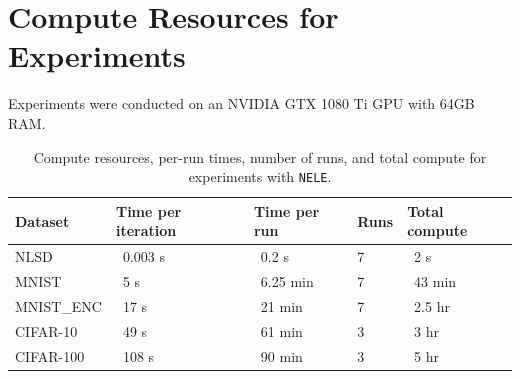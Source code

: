 \documentclass{article}
\begin{document}
\section{Compute Resources for Experiments}
\label{app:compute}
Experiments were conducted on an NVIDIA GTX 1080 Ti GPU 
with 64GB RAM.
\begin{table}[h]
\caption{Compute resources, per-run times, number of runs, and total compute for experiments with \texttt{NELE}.}
\small
\centering
\begin{tabular}{l l l l l}
\textbf{Dataset} & \textbf{Time per iteration} & \textbf{Time per run} & \textbf{Runs} & \textbf{Total compute} \\
\hline
NLSD & ~0.003 s & ~0.2 s & 7 & ~2 s \\
MNIST & ~5 s & ~6.25 min & 7 & ~43 min \\
MNIST\_ENC & ~17 s & ~21 min & 7 & ~2.5 hr \\
CIFAR-10 & ~49 s & ~61 min & 3 & ~3 hr \\
CIFAR-100 & ~108 s & ~90 min & 3 & ~5 hr \\
\end{tabular}
\end{table}
\end{document}
